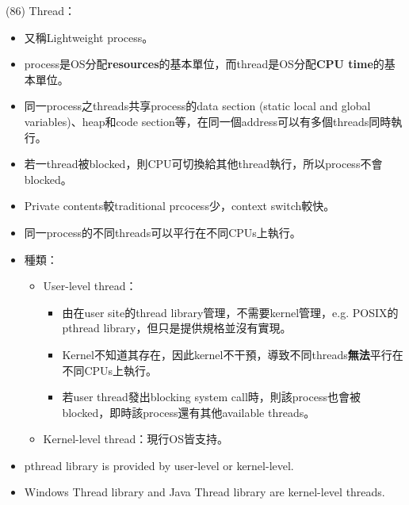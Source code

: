 \begin{theorem}{(86)} Thread：\begin{itemize}
        \item 又稱Lightweight process。
        \item process是OS分配\textbf{resources}的基本單位，而thread是OS分配\textbf{CPU time}的基本單位。
        \item 同一process之threads共享process的data section (static local and global variables)、heap和code section等，在同一個address可以有多個threads同時執行。
        \item 若一thread被blocked，則CPU可切換給其他thread執行，所以process不會blocked。
        \item Private contents較traditional prcocess少，context switch較快。
        \item 同一process的不同threads可以平行在不同CPUs上執行。
        \item 種類：\begin{itemize}
            \item User-level thread：\begin{itemize}
                \item 由在user site的thread library管理，不需要kernel管理，e.g. POSIX的pthread library，但只是提供規格並沒有實現。
                \item Kernel不知道其存在，因此kernel不干預，導致不同threads\textbf{無法}平行在不同CPUs上執行。
                \item 若user thread發出blocking system call時，則該process也會被blocked，即時該process還有其他available threads。
            \end{itemize}
            \item Kernel-level thread：現行OS皆支持。
        \end{itemize}
        \item pthread library is provided by user-level or kernel-level.
        \item Windows Thread library and Java Thread library are kernel-level threads.
    \end{itemize}
\end{theorem}

